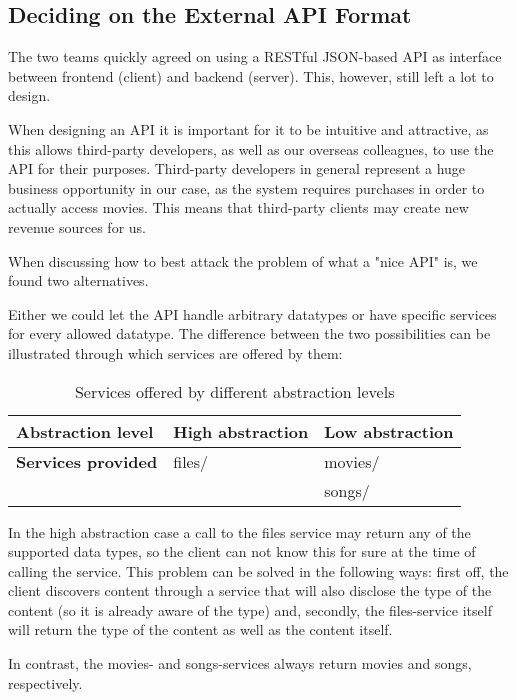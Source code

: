 \subsection{Deciding on the External API Format}

The two teams quickly agreed on using a RESTful JSON-based API as interface between
frontend (client) and backend (server). This, however, still left a lot to design.

When designing an API it is important for it to be intuitive and attractive, as this
allows third-party developers, as well as our overseas colleagues, to use the API for
their purposes. Third-party developers in general represent a huge business opportunity
in our case, as the system requires purchases in order to actually access movies. This
means that third-party clients may create new revenue sources for us.

When discussing how to best attack the problem of what a "nice API" is, we found two
alternatives.

Either we could let the API handle arbitrary datatypes or have specific services for
every allowed datatype. The difference between the two possibilities can be illustrated
through which services are offered by them:

\begin{table}[hbt]
    \begin{tabular}{ | l | l | l | }
        \hline
        \textbf{Abstraction level} & High abstraction & Low abstraction \\
        \hline
        \textbf{Services provided} & files/ & movies/ \\
        &  & songs/ \\
        \hline
    \end{tabular}
    \caption{Services offered by different abstraction levels}
\end{table}

In the high abstraction case a call to the files service may return any of the supported
data types, so the client can not know this for sure at the time of calling the service.
This problem can be solved in the following ways: first off, the client discovers content
through a service that will also disclose the type of the content (so it is already aware
of the type) and, secondly, the files-service itself will return the type of the content
as well as the content itself.

In contrast, the movies- and songs-services always return movies and songs, respectively.


